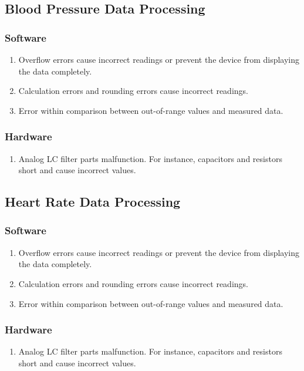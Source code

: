 \documentclass{article}
\begin{document}
    
    \subsection{Blood Pressure Data Processing}
        \subsubsection{Software}
            \begin{enumerate} [label = (\alph*)]
                \item Overflow errors cause incorrect readings or prevent the device from displaying the data completely.
                \item Calculation errors and rounding errors cause incorrect readings.
                \item Error within comparison between out-of-range values and measured data.
            \end{enumerate}
        \subsubsection{Hardware}
            \begin{enumerate}[label = (\alph*)]
                \item Analog LC filter parts malfunction.  For instance, capacitors and resistors short and cause incorrect values.
            \end{enumerate}
    
    \subsection{Heart Rate Data Processing}
        \subsubsection{Software}
            \begin{enumerate}[label = (\alph*)]
                \item Overflow errors cause incorrect readings or prevent the device from displaying the data completely.
                \item Calculation errors and rounding errors cause incorrect readings.
                \item Error within comparison between out-of-range values and measured data. 
            \end{enumerate}
        \subsubsection{Hardware}
            \begin{enumerate}[label = (\alph*)]
                \item Analog LC filter parts malfunction.  For instance, capacitors and resistors short and cause incorrect values.
            \end{enumerate}
    
\end{document}
